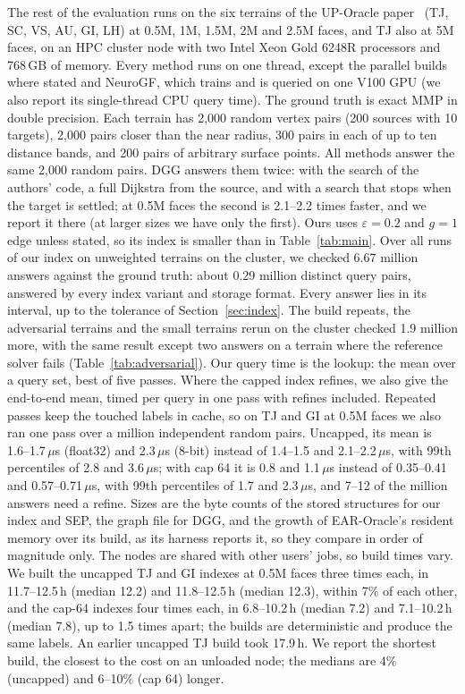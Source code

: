 \documentclass[sigconf,nonacm,screen]{acmart}
\newcommand{\eps}{\varepsilon}
\begin{document}
The rest of the evaluation runs on the six terrains of the UP-Oracle paper~\cite{yan2025up} (TJ, SC, VS, AU, GI,
LH) at 0.5M, 1M, 1.5M, 2M and 2.5M faces, and TJ also at 5M faces, on an HPC cluster node with two Intel Xeon Gold 6248R processors and
768\,GB of memory. Every method runs on one thread, except the parallel builds where stated and NeuroGF, which trains and is queried on one V100 GPU
(we also report its single-thread CPU query time). The ground truth is exact MMP in double precision. Each terrain
has 2,000 random vertex pairs (200 sources with 10 targets), 2,000 pairs closer than the near radius, 300 pairs in
each of up to ten distance bands, and 200 pairs of arbitrary surface points. All methods answer the same 2,000
random pairs. DGG answers them twice: with the search of the authors' code, a full Dijkstra from the source, and
with a search that stops when the target is settled; at 0.5M faces the second is 2.1--2.2 times faster, and we
report it there (at larger sizes we have only the first). Ours
uses $\eps=0.2$ and $g=1$ edge unless stated, so its index is smaller than in Table~\ref{tab:main}. Over all runs of
our index on unweighted terrains on the cluster, we checked 6.67 million answers against the ground truth: about
0.29 million distinct query pairs, answered by every index variant and storage format. Every answer lies in its
interval, up to the tolerance of Section~\ref{sec:index}. The build repeats, the adversarial terrains and the
small terrains rerun on the cluster checked 1.9 million more, with the same result except two answers on a
terrain where the reference solver fails (Table~\ref{tab:adversarial}). Our query time is the lookup: the mean over a query set,
best of five passes. Where the capped index refines, we also give the end-to-end mean, timed per query in one
pass with refines included. Repeated passes keep the touched labels in cache, so on TJ and GI at 0.5M faces we
also ran one pass over a million independent random pairs. Uncapped, its mean is 1.6--1.7\,$\mu$s (float32) and
2.3\,$\mu$s (8-bit) instead of 1.4--1.5 and 2.1--2.2\,$\mu$s, with 99th percentiles of 2.8 and 3.6\,$\mu$s; with
cap 64 it is 0.8 and 1.1\,$\mu$s instead of 0.35--0.41 and 0.57--0.71\,$\mu$s, with 99th percentiles of 1.7 and
2.3\,$\mu$s, and 7--12 of the million answers need a refine. Sizes are the byte counts of the stored structures for our index and SEP, the graph file for DGG, and the
growth of EAR-Oracle's resident memory over its build, as its harness reports it, so they compare in order of
magnitude only. The nodes are shared with other users' jobs, so build times vary. We built the uncapped TJ and GI indexes at
0.5M faces three times each, in 11.7--12.5\,h (median 12.2) and 11.8--12.5\,h (median 12.3), within 7\% of each
other, and the cap-64 indexes four times each, in 6.8--10.2\,h (median 7.2) and 7.1--10.2\,h (median 7.8), up to
1.5 times apart; the builds are deterministic and produce the same labels. An earlier uncapped TJ build took
17.9\,h. We report the shortest build, the closest to the cost on an unloaded node; the medians are 4\% (uncapped)
and 6--10\% (cap 64) longer.
\end{document}
